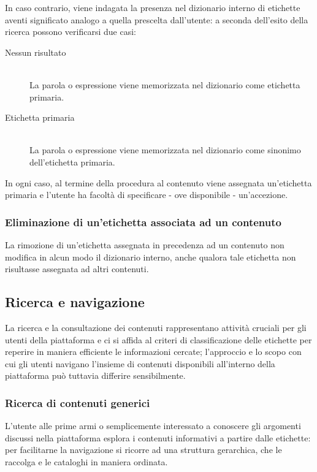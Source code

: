 \documentclass[10pt,a4paper,headinclude,footinclude,hidelinks]{scrreprt} %
\begin{document}
	In caso contrario, viene indagata la presenza nel dizionario interno di etichette aventi significato analogo a quella prescelta dall'utente: a seconda dell'esito della ricerca possono verificarsi due casi:
	\begin{description}
	\item[Nessun risultato] \hfill \\
	La parola o espressione viene memorizzata nel dizionario come etichetta primaria.
	\item[Etichetta primaria] \hfill \\
	La parola o espressione viene memorizzata nel dizionario come sinonimo dell'etichetta primaria.
	\end{description}

	In ogni caso, al termine della procedura al contenuto viene assegnata un'etichetta primaria e l'utente ha facoltà di specificare - ove disponibile - un'accezione.
	\subsubsection{Eliminazione di un'etichetta associata ad un contenuto}
	La rimozione di un'etichetta assegnata in precedenza ad un contenuto non modifica in alcun modo il dizionario interno, anche qualora tale etichetta non risultasse assegnata ad altri contenuti.

	\subsection{Ricerca e navigazione}
	La ricerca e la consultazione dei contenuti rappresentano attività cruciali per gli utenti della piattaforma e ci si affida al criteri di classificazione delle etichette per reperire in maniera efficiente le informazioni cercate; l'approccio e lo scopo con cui gli utenti navigano l'insieme di contenuti disponibili all'interno della piattaforma può tuttavia differire sensibilmente.

	\subsubsection{Ricerca di contenuti generici}
	L'utente alle prime armi o semplicemente interessato a conoscere gli argomenti discussi nella piattaforma esplora i contenuti informativi a partire dalle etichette: per facilitarne la navigazione si ricorre ad una struttura gerarchica, che le raccolga e le cataloghi in maniera ordinata.
\end{document}
